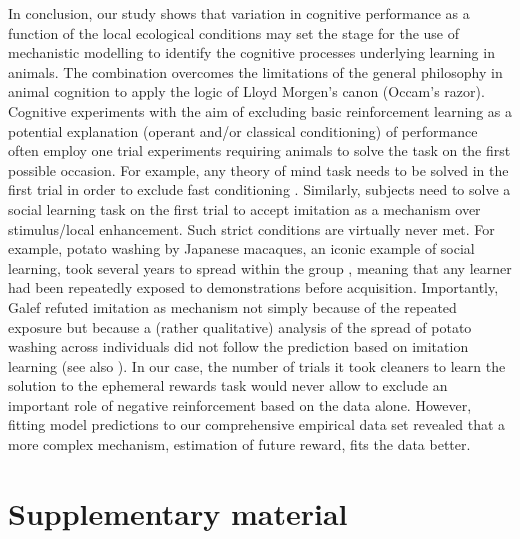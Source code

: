 \documentclass[]{rsos}%
\newcommand{\beginsupplement}{ \setcounter{table}{0}     \renewcommand{\thetable}{S\arabic{table}}\setcounter{figure}{0} \renewcommand{\thefigure}{S\arabic{figure}}}
\begin{document}
In conclusion, our study shows that variation in cognitive performance as
a function of the local ecological conditions may set the stage for the use of
mechanistic modelling to identify the cognitive processes underlying
learning in animals. The combination overcomes the limitations
of the general philosophy in animal cognition to apply the logic of
Lloyd Morgen's canon (Occam's razor). Cognitive experiments with the
aim of excluding basic reinforcement learning as a potential
explanation (operant and/or classical conditioning) of performance
often employ one trial experiments requiring animals to solve the
task on the first possible occasion.
For example, any theory of mind task needs to be solved in the first
trial in order to exclude fast conditioning \citep{heyes_Theory_1998}.
Similarly, subjects need to solve a social learning task on the first
trial to accept imitation as a mechanism over stimulus/local
enhancement. Such strict conditions are virtually never met. For
example, potato washing by Japanese macaques, an iconic example of
social learning, took several years to spread within the group
\citep{kawamura_Process_1959}, meaning that any learner had been repeatedly
exposed to demonstrations before acquisition. Importantly, Galef
\citep{galef_Question_1992} refuted imitation as mechanism not simply because
of the repeated exposure but because a (rather qualitative) analysis of
the spread of potato washing across individuals did not follow the
prediction based on imitation learning (see also
\citep{hirata_SweetPotato_2001}). In our case, the number of trials it took
cleaners to learn the solution to the ephemeral rewards task
would never allow to exclude an important role of
negative reinforcement based on the data
alone. However, fitting model predictions to our comprehensive empirical
data set revealed that a more complex mechanism, estimation of future reward,
fits the data better.

\newpage

\hypertarget{supplementary-material}{%
\section{Supplementary material}\label{supplementary-material}}

\beginsupplement
\end{document}

